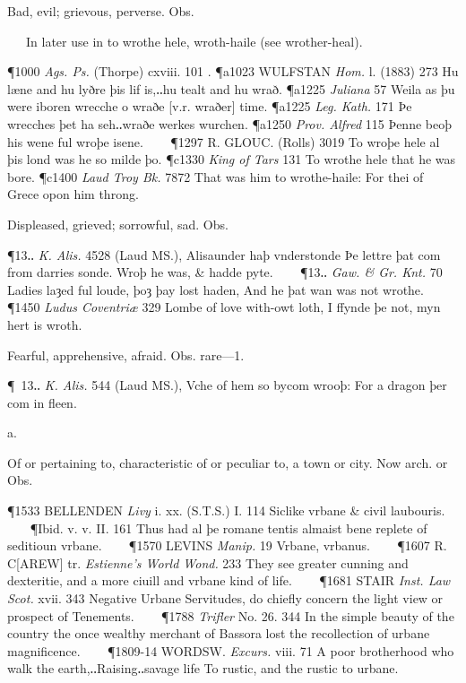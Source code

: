 \begin{description}[wide, labelwidth=!, labelindent=0pt]
\begin{myenumerate}
 Bad, evil; grievous, perverse. Obs.

   In later use in to wrothe hele, wroth-haile (see wrother-heal).

\P 1000  \textit{Ags. Ps.} (Thorpe) cxviii. 101 .
\P a1023 WULFSTAN  \textit{Hom.} l. (1883) 273 Hu læne and hu lyðre þis lif is,‥hu tealt and hu wrað.
\P a1225 \textit{Juliana}  57 Weila as þu were iboren wrecche o wraðe [v.r. wraðer] time.
\P a1225  \textit{Leg. Kath.} 171 Þe wrecches þet ha seh‥wraðe werkes wurchen.
\P a1250  \textit{Prov. Alfred} 115 Þenne beoþ his wene ful wroþe isene.    
\P 1297 R. GLOUC.  (Rolls) 3019 To wroþe hele al þis lond was he so milde þo.
\P c1330 \textit{King  of Tars} 131 To wrothe hele that he was bore.
\P c1400 \textit{Laud  Troy Bk.} 7872 That was him to wrothe-haile: For thei of Grece opon him throng.

 Displeased, grieved; sorrowful, sad. Obs.

\P 13‥ \textit{K. Alis.} 4528 (Laud MS.), Alisaunder haþ vnderstonde Þe lettre þat com from darries sonde. Wroþ he was, \& hadde pyte.    
\P 13‥ \textit{Gaw. \& Gr. Knt.} 70 Ladies laȝed ful loude, þoȝ þay lost haden, And he þat wan was not wrothe.    
\P 1450 \textit{Ludus  Coventriæ} 329 Lombe of love with-owt loth, I ffynde þe not, myn hert is wroth.

 Fearful, apprehensive, afraid. Obs. rare—1.

\P 13‥ \textit{K. Alis.} 544 (Laud MS.), Vche of hem so bycom wrooþ: For a dragon þer com in fleen.
\end{myenumerate}


 a.

\noindent {}

\vspace{-0.3cm}

\begin{myenumerate}

 Of or pertaining to, characteristic of or peculiar to, a town or city. Now arch. or Obs.

\P 1533 BELLENDEN  \textit{Livy} i. xx. (S.T.S.) I. 114 Siclike vrbane \& civil laubouris.    
\P Ibid. v. v. II. 161 Thus had al þe romane tentis almaist bene replete of seditioun vrbane.    
\P 1570 LEVINS  \textit{Manip.} 19 Vrbane, vrbanus.    
\P 1607 R. C[AREW] tr. \textit{Estienne's World Wond.} 233 They see greater cunning and dexteritie, and a more ciuill and vrbane kind of life.    
\P 1681 STAIR  \textit{Inst. Law Scot.} xvii. 343 Negative Urbane Servitudes, do chiefly concern the light view or prospect of Tenements.    
\P 1788 \textit{Trifler}  No. 26. 344 In the simple beauty of the country the once wealthy merchant of Bassora lost the recollection of urbane magnificence.    
\P 1809-14 WORDSW.  \textit{Excurs.} viii. 71 A poor brotherhood who walk the earth,‥Raising‥savage life To rustic, and the rustic to urbane.


\end{myenumerate}
\end{description}
